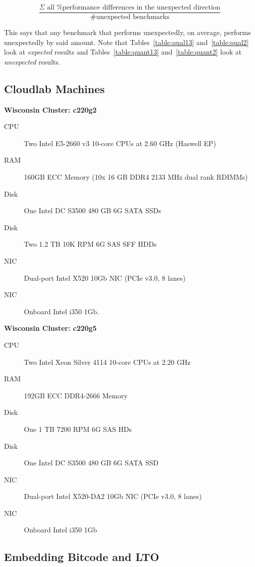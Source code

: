\documentclass{article}
\begin{document}
$$
\frac{\Sigma \text{ all \% performance differences in the unexpected direction}}{\text{\# unexpected benchmarks}}
$$

\medskip
\noindent This says that any benchmark that performs unexpectedly, on average, performs unexpectedly by said amount.
%
Note that Tables~\ref{table:qual13} and~\ref{table:qual2} look at \textit{expected} results and Tables~\ref{table:quant13} and~\ref{table:quant2} look at \textit{unexpected} results. 

\subsection{Cloudlab Machines}
\label{sec:hw}
\bigskip

\textbf{Wisconsin Cluster: c220g2}

\begin{description}
\item[CPU] Two Intel E5-2660 v3 10-core CPUs at 2.60 GHz (Haswell EP)
\item[RAM] 160GB ECC Memory (10x 16 GB DDR4 2133 MHz dual rank RDIMMs)
\item[Disk] One Intel DC S3500 480 GB 6G SATA SSDs
\item[Disk] Two 1.2 TB 10K RPM 6G SAS SFF HDDs
\item[NIC] Dual-port Intel X520 10Gb NIC (PCIe v3.0, 8 lanes)
\item[NIC] Onboard Intel i350 1Gb.
\end{description}
\bigskip

\noindent\textbf{Wisconsin Cluster: c220g5}

\begin{description}
\item[CPU] Two Intel Xeon Silver 4114 10-core CPUs at 2.20 GHz
\item[RAM] 192GB ECC DDR4-2666 Memory
\item[Disk] One 1 TB 7200 RPM 6G SAS HDs
\item[Disk] One Intel DC S3500 480 GB 6G SATA SSD
\item[NIC] Dual-port Intel X520-DA2 10Gb NIC (PCIe v3.0, 8 lanes)
\item[NIC] Onboard Intel i350 1Gb
\end{description}

\subsection{Embedding Bitcode and LTO}
\end{document}
